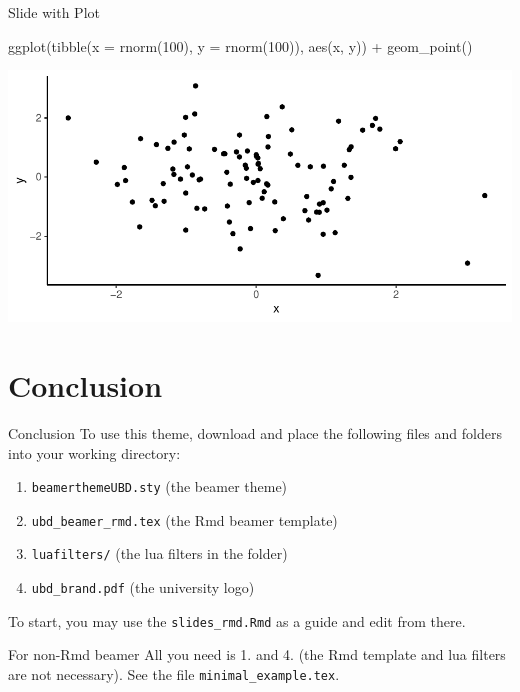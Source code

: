 \documentclass[,aspectratio=43]{beamer}
\newenvironment{Shaded}{\begin{snugshade}}{\end{snugshade}}
\newcommand{\AttributeTok}[1]{\textcolor[rgb]{0.77,0.63,0.00}{#1}}
\newcommand{\DecValTok}[1]{\textcolor[rgb]{0.00,0.00,0.81}{#1}}
\newcommand{\FunctionTok}[1]{\textcolor[rgb]{0.00,0.00,0.00}{#1}}
\newcommand{\NormalTok}[1]{#1}
\newcommand{\SpecialCharTok}[1]{\textcolor[rgb]{0.00,0.00,0.00}{#1}}
\providecommand{\tightlist}{%
  \setlength{\itemsep}{0pt}\setlength{\parskip}{0pt}}
\begin{document}
\begin{frame}[fragile]{Slide with Plot}
\protect\hypertarget{slide-with-plot}{}
\vspace{-1em}

\begin{Shaded}
\begin{Highlighting}[]
\FunctionTok{ggplot}\NormalTok{(}\FunctionTok{tibble}\NormalTok{(}\AttributeTok{x =} \FunctionTok{rnorm}\NormalTok{(}\DecValTok{100}\NormalTok{), }\AttributeTok{y =} \FunctionTok{rnorm}\NormalTok{(}\DecValTok{100}\NormalTok{)), }\FunctionTok{aes}\NormalTok{(x, y)) }\SpecialCharTok{+}
  \FunctionTok{geom\_point}\NormalTok{()}
\end{Highlighting}
\end{Shaded}

\begin{center}\includegraphics{figure/slideplot-1} \end{center}
\end{frame}

\hypertarget{conclusion}{%
\section{Conclusion}\label{conclusion}}

\begin{frame}[fragile]{Conclusion}
To use this theme, download and place the following files and folders
into your working directory:

\begin{enumerate}
\tightlist
\item
  \texttt{beamerthemeUBD.sty} (the beamer theme)
\item
  \texttt{ubd\_beamer\_rmd.tex} (the Rmd beamer template)
\item
  \texttt{luafilters/} (the lua filters in the folder)
\item
  \texttt{ubd\_brand.pdf} (the university logo)
\end{enumerate}

To start, you may use the \texttt{slides\_rmd.Rmd} as a guide and edit
from there.

\begin{block}{For non-Rmd beamer}
\protect\hypertarget{for-non-rmd-beamer}{}
All you need is 1. and 4. (the Rmd template and lua filters are not
necessary). See the file \texttt{minimal\_example.tex}.
\end{block}
\end{frame}
\end{document}
